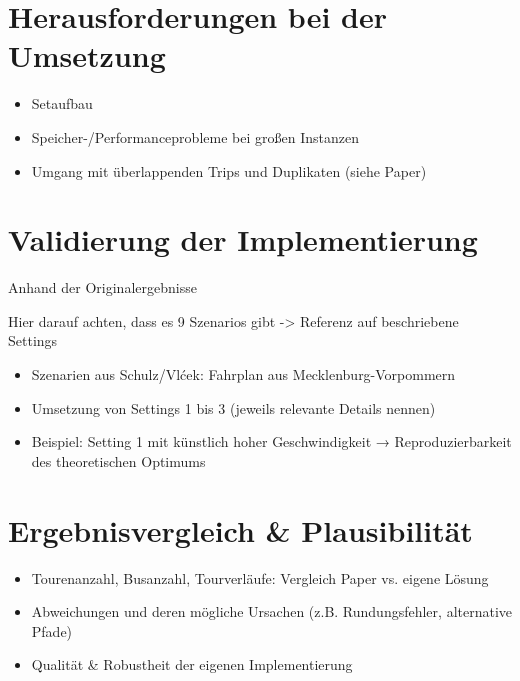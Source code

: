 \section{Herausforderungen bei der Umsetzung}
\begin{itemize}
    \item Setaufbau
    \item Speicher-/Performanceprobleme bei großen Instanzen
    \item Umgang mit überlappenden Trips und Duplikaten (siehe Paper)
\end{itemize}

\section{Validierung der Implementierung} 

Anhand der Originalergebnisse

Hier darauf achten, dass es 9 Szenarios gibt -> Referenz auf beschriebene Settings

\begin{itemize}
    \item Szenarien aus Schulz/Vlćek: Fahrplan aus Mecklenburg-Vorpommern
    \item Umsetzung von Settings 1 bis 3 (jeweils relevante Details nennen)
    \item Beispiel: Setting 1 mit künstlich hoher Geschwindigkeit → Reproduzierbarkeit des theoretischen Optimums
\end{itemize}
\section{Ergebnisvergleich \& Plausibilität}
\begin{itemize}
\item Tourenanzahl, Busanzahl, Tourverläufe: Vergleich Paper vs. eigene Lösung
\item Abweichungen und deren mögliche Ursachen (z.B. Rundungsfehler, alternative Pfade)
\item Qualität \& Robustheit der eigenen Implementierung
\end{itemize}


